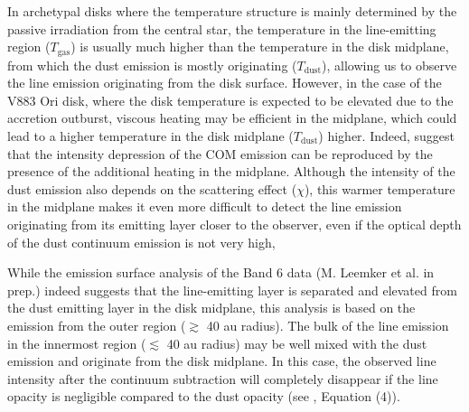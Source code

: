\documentclass[twocolumn, twocolappendix, astrosymb, times]{aastex631}
\begin{document}
In archetypal disks where the temperature structure is mainly determined by the passive irradiation from the central star, the temperature in the line-emitting region ($T_\mathrm{gas}$) is usually much higher than the temperature in the disk midplane, from which the dust emission is mostly originating ($T_\mathrm{dust}$), allowing us to observe the line emission originating from the disk surface. However, in the case of the V883 Ori disk, where the disk temperature is expected to be elevated due to the accretion outburst, viscous heating may be efficient in the midplane, which could lead to a higher temperature in the disk midplane ($T_\mathrm{dust}$) higher. Indeed, \citet{Lee2019} suggest that the intensity depression of the COM emission can be reproduced by the presence of the additional heating in the midplane. Although the intensity of the dust emission also depends on the scattering effect ($\chi$), this warmer temperature in the midplane makes it even more difficult to detect the line emission originating from its emitting layer closer to the observer, even if the optical depth of the dust continuum emission is not very high, 

While the emission surface analysis of the Band 6 data (M. Leemker et al. in prep.) indeed suggests that the line-emitting layer is separated and elevated from the dust emitting layer in the disk midplane, this analysis is based on the emission from the outer region ($\gtrsim$ 40 au radius).
The bulk of the line emission in the innermost region ($\lesssim$ 40 au radius) may be well mixed with the dust emission and originate from the disk midplane. In this case, the observed line intensity after the continuum subtraction will completely disappear if the line opacity is negligible compared to the dust opacity (see \citealt{Bosman2021}, Equation (4)). 


\end{document}
